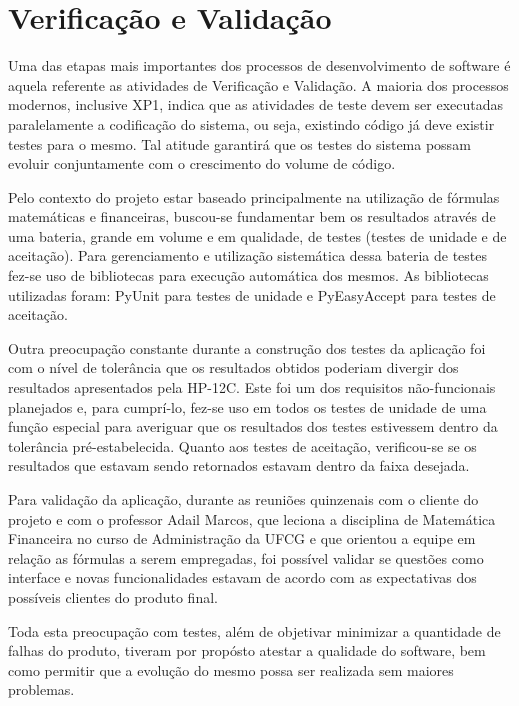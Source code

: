 \chapter{Verificação e Validação}

Uma das etapas mais importantes dos processos de desenvolvimento de software é aquela referente as atividades de Verificação e Validação. A maioria dos processos modernos, inclusive XP1, indica que as atividades de teste devem ser executadas paralelamente a codificação do sistema, ou seja, existindo código já deve existir testes para o mesmo. Tal atitude garantirá que os testes do sistema possam evoluir conjuntamente com o crescimento do volume de código.

Pelo contexto do projeto estar baseado principalmente na utilização de fórmulas matemáticas e financeiras, buscou-se fundamentar bem os resultados através de uma bateria, grande em volume e em qualidade, de testes (testes de unidade e de aceitação). Para gerenciamento e utilização sistemática dessa bateria de testes fez-se uso de bibliotecas para execução automática dos mesmos. As bibliotecas utilizadas foram: PyUnit para testes de unidade e PyEasyAccept para testes de aceitação.

Outra preocupação constante durante a construção dos testes da aplicação foi com o nível de tolerância que os resultados obtidos poderiam divergir dos resultados apresentados pela HP-12C. Este foi um dos requisitos não-funcionais planejados e, para cumprí-lo, fez-se uso em todos os testes de unidade de uma função especial para averiguar que os resultados dos testes estivessem dentro da tolerância pré-estabelecida. Quanto aos testes de aceitação, verificou-se se os resultados que estavam sendo retornados estavam dentro da faixa desejada.

Para validação da aplicação, durante as reuniões quinzenais com o cliente do projeto e com o professor Adail Marcos, que leciona a disciplina de Matemática Financeira no curso de Administração da UFCG e que orientou a equipe em relação as fórmulas a serem empregadas, foi possível validar se questões como interface e novas funcionalidades estavam de acordo com as expectativas dos possíveis clientes do produto final.

Toda esta preocupação com testes, além de objetivar minimizar a quantidade de falhas do produto, tiveram por propósto atestar a qualidade do software, bem como permitir que a evolução do mesmo possa ser realizada sem maiores problemas.

